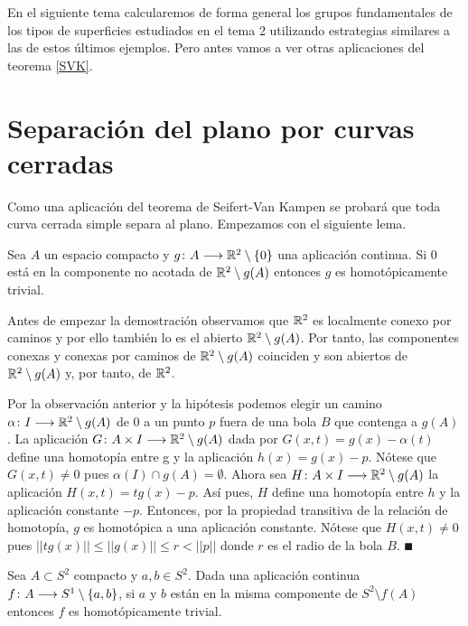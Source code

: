 \documentclass[GTS.tex]{subfiles}
\begin{document}
\vspace{0.4cm}

En el siguiente tema calcularemos de forma general los grupos fundamentales de los tipos de superficies estudiados en el tema 2 utilizando estrategias similares a las de estos últimos ejemplos. Pero antes vamos a ver otras aplicaciones del teorema \ref{SVK}.

\section{Separación del plano por curvas cerradas}

Como una aplicación del teorema de Seifert-Van Kampen se probará que toda curva cerrada simple separa al plano. Empezamos con el siguiente lema.

\begin{lemma}\label{1}
Sea $A$ un espacio compacto y $g\colon{A}\longrightarrow{\mathbb{R}^2\setminus\{0\}}$ una aplicación continua. Si $0$ está en la componente no acotada de $\mathbb{R}^2\setminus g(A)$  entonces $g$ es homotópicamente trivial.
\end{lemma}

Antes de empezar la demostración observamos que $\mathbb{R}^2$ es localmente conexo por caminos y por ello también lo es el abierto $\mathbb{R}^2\setminus g(A)$. Por tanto, las componentes conexas y conexas por caminos de $\mathbb{R}^2\setminus g(A)$ coinciden y son abiertos de $\mathbb{R}^2\setminus g(A)$ y, por tanto, de $\mathbb{R}^2$.
\begin{dem}
Por la observación anterior y la hipótesis podemos elegir un camino $\alpha\colon{I}\longrightarrow{\mathbb{R}^2\setminus g(A)}$ de $0$ a un punto $p$ fuera de una bola $B$ que contenga a $g(A)$. La aplicación $G\colon{A\times I}\longrightarrow{\mathbb{R}^2\setminus g(A)}$ dada por $G(x,t)=g(x)-\alpha(t)$ define una homotopía entre g y la aplicación $h(x)=g(x)-p$. Nótese que $G(x,t)\neq 0$ pues $\alpha(I)\cap g(A)=\emptyset$. Ahora sea $H\colon{A\times I}\longrightarrow{\mathbb{R}^2\setminus g(A)}$ la aplicación $H(x,t)=tg(x)-p$. Así pues, $H$ define una homotopía entre $h$ y la aplicación constante $-p$. Entonces, por la propiedad transitiva de la relación de homotopía, $g$ es homotópica a una aplicación constante. Nótese que $H(x,t)\neq 0$ pues $||tg(x)||\leq||g(x)||\leq r <||p||$ donde $r$ es el radio de la bola $B$. $\QED$
\end{dem}

\begin{lemma}\label{2}
Sea $A\subset S^2$ compacto y $a,b\in S^2$. Dada una aplicación continua $f\colon{A}\longrightarrow{S^1\setminus\{a,b\}}$, si $a$ y $b$ están en la misma componente de $S^2\setminus f(A)$ entonces $f$ es homotópicamente trivial. 
\end{lemma}
\end{document}
